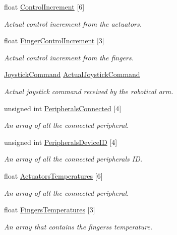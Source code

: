 \begin{DoxyCompactItemize}
float \hyperlink{struct_general_informations_a361a511d14fdf377e15ce86d6ef3e3c7}{Control\+Increment} \mbox{[}6\mbox{]}
\begin{DoxyCompactList}\small\item\em Actual control increment from the actuators. \end{DoxyCompactList}\item 
float \hyperlink{struct_general_informations_a538144c6ae5efec5dbeac1db517480ed}{Finger\+Control\+Increment} \mbox{[}3\mbox{]}
\begin{DoxyCompactList}\small\item\em Actual control increment from the fingers. \end{DoxyCompactList}\item 
\hyperlink{struct_joystick_command}{Joystick\+Command} \hyperlink{struct_general_informations_ac410a6988b0b124a005e0669c9f2172a}{Actual\+Joystick\+Command}
\begin{DoxyCompactList}\small\item\em Actual joystick command received by the robotical arm. \end{DoxyCompactList}\item 
unsigned int \hyperlink{struct_general_informations_a0e7edf0a7d68bc5186b054bf3764699a}{Peripherals\+Connected} \mbox{[}4\mbox{]}
\begin{DoxyCompactList}\small\item\em An array of all the connected peripheral. \end{DoxyCompactList}\item 
unsigned int \hyperlink{struct_general_informations_a6edf5533337f8d17956550364467679b}{Peripherals\+Device\+ID} \mbox{[}4\mbox{]}
\begin{DoxyCompactList}\small\item\em An array of all the connected peripheral\textquotesingle{}s ID. \end{DoxyCompactList}\item 
float \hyperlink{struct_general_informations_ad763ff96b47d372343c3f446e9b47463}{Actuators\+Temperatures} \mbox{[}6\mbox{]}
\begin{DoxyCompactList}\small\item\em An array of all the connected peripheral. \end{DoxyCompactList}\item 
float \hyperlink{struct_general_informations_a45e5897f59b7d00c5159a0a2e8d151d8}{Fingers\+Temperatures} \mbox{[}3\mbox{]}
\begin{DoxyCompactList}\small\item\em An array that contains the fingers\textquotesingle{}s temperature. \end{DoxyCompactList}\item 

\end{DoxyCompactItemize}
